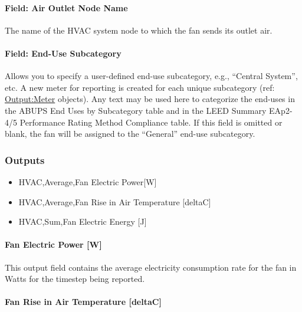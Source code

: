 \paragraph{Field: Air Outlet Node Name}\label{field-air-outlet-node-name-002}

The name of the HVAC system node to which the fan sends its outlet air.

\paragraph{Field: End-Use Subcategory}\label{field-end-use-subcategory-001}

Allows you to specify a user-defined end-use subcategory, e.g., ``Central System'', etc. A new meter for reporting is created for each unique subcategory (ref: \hyperref[outputmeter-and-outputmetermeterfileonly]{Output:Meter} objects). Any text may be used here to categorize the end-uses in the ABUPS End Uses by Subcategory table and in the LEED Summary EAp2-4/5 Performance Rating Method Compliance table. If this field is omitted or blank, the fan will be assigned to the ``General'' end-use subcategory.

\subsubsection{Outputs}\label{outputs-013}

\begin{itemize}
\item
  HVAC,Average,Fan Electric Power{[}W{]}
\item
  HVAC,Average,Fan Rise in Air Temperature {[}deltaC{]}
\item
  HVAC,Sum,Fan Electric Energy {[}J{]}
\end{itemize}

\paragraph{Fan Electric Power {[}W{]}}\label{fan-electric-power-w}

This output field contains the average electricity consumption rate for the fan in Watts for the timestep being reported.

\paragraph{Fan Rise in Air Temperature {[}deltaC{]}}\label{fan-rise-in-air-temperature-deltac}

